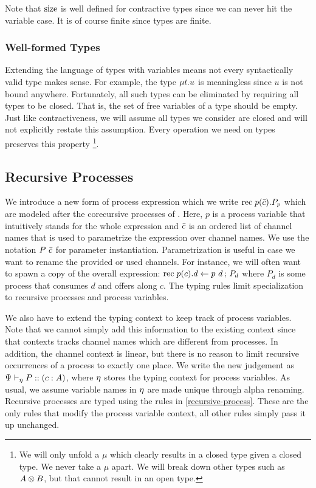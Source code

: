 Note that $\operatorname{size}$ is well defined for contractive types since we can never hit the variable case. It is of course finite since types are finite.


\subsubsection{Well-formed Types}

Extending the language of types with variables means not every syntactically valid type makes sense. For example, the type $\mu{t} . {u}$ is meaningless since $u$ is not bound anywhere. Fortunately, all such types can be eliminated by requiring all types to be closed. That is, the set of free variables of a type should be empty. Just like contractiveness, we will assume all types we consider are closed and will not explicitly restate this assumption. Every operation we need on types preserves this property%
\footnote{We will only unfold a $\mu$ which clearly results in a closed type given a closed type. We never take a $\mu$ apart. We will break down other types such as $A \otimes B$, but that cannot result in an open type.}.


\subsection{Recursive Processes}

We introduce a new form of process expression which we write $\mathrm{rec}\; {p}(\bar{c}) . {P}_p$ which are modeled after the corecursive processes of \cite{ToninhoCP14}. Here, $p$ is a process variable that intuitively stands for the whole expression and $\bar{c}$ is an ordered list of channel names that is used to parametrize the expression over channel names. We use the notation ${P}~{\bar{c}}$ for parameter instantiation. Parametrization is useful in case we want to rename the provided or used channels. For instance, we will often want to spawn a copy of the overall expression: $\mathrm{rec}\; {p}(c) . {d \leftarrow {p}~{d} \,;\, P_d}$ where $P_d$ is some process that consumes $d$ and offers along $c$. The typing rules limit specialization to recursive processes and process variables.

We also have to extend the typing context to keep track of process variables. Note that we cannot simply add this information to the existing context since that contexts tracks channel names which are different from processes. In addition, the channel context is linear, but there is no reason to limit recursive occurrences of a process to exactly one place. We write the new judgement as ${\Psi} \vdash_{\eta} P :: (c : A)$, where $\eta$ stores the typing context for process variables. As usual, we assume variable names in $\eta$ are made unique through alpha renaming. Recursive processes are typed using the rules in \cref{recursive-process}. These are the only rules that modify the process variable context, all other rules simply pass it up unchanged.

